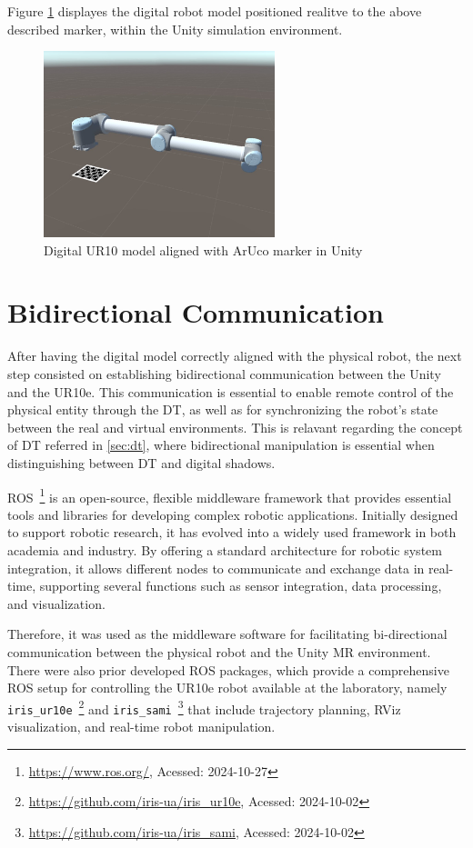 Figure \ref{f:ur10_marker_unity} displayes the digital robot model positioned realitve to the above described marker, within the Unity simulation environment.

\begin{figure}[h]
    \centering
    \includegraphics[width=0.6\textwidth]{figs/robot_marker_unity.jpg}
    \caption{Digital UR10 model aligned with ArUco marker in Unity}
    \label{f:ur10_marker_unity}
\end{figure}

\section{Bidirectional Communication}

After having the digital model correctly aligned with the physical robot, the next step consisted on establishing bidirectional communication between the Unity and the UR10e. This communication is essential to enable remote control of the physical entity through the \ac{DT}, as well as for synchronizing the robot's state between the real and virtual environments. This is relavant regarding the concept of \ac{DT} referred in \ref{sec:dt}, where bidirectional manipulation is essential when distinguishing between \ac{DT} and digital shadows. 

\ac{ROS}~\footnote{\url{https://www.ros.org/}, Acessed: 2024-10-27} is an open-source, flexible middleware framework that provides essential tools and libraries for developing complex robotic applications. Initially designed to support robotic research, it has evolved into a widely used framework in both academia and industry. By offering a standard architecture for robotic system integration, it allows different nodes to communicate and exchange data in real-time, supporting several functions such as sensor integration, data processing, and visualization.

Therefore, it was used as the middleware software for facilitating bi-directional communication between the physical robot and the Unity \ac{MR} environment. There were also prior developed \ac{ROS} packages, which provide a comprehensive \ac{ROS} setup for controlling the UR10e robot available at the laboratory, namely \texttt{iris\_ur10e}~\footnote{\url{https://github.com/iris-ua/iris_ur10e}, Acessed: 2024-10-02} and \texttt{iris\_sami}~\footnote{\url{https://github.com/iris-ua/iris_sami}, Acessed: 2024-10-02} that include trajectory planning, RViz visualization, and real-time robot manipulation.
